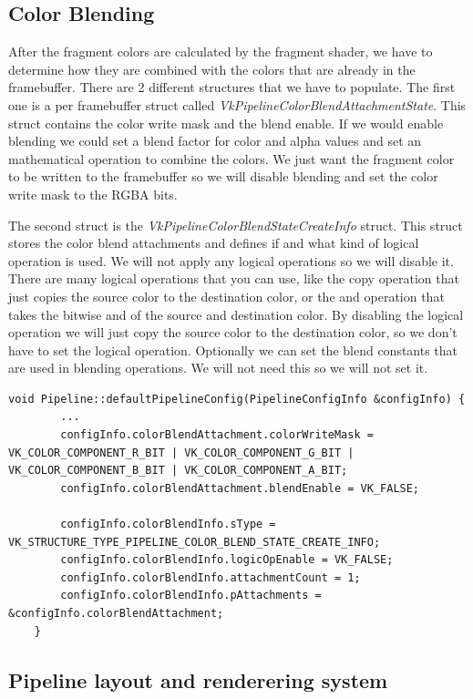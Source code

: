 \documentclass[12pt]{report} \usepackage{preamble}
\begin{document}
\subsection{Color Blending}

After the fragment colors are calculated by the fragment shader, we have to determine how they are combined with the colors
that are already in the framebuffer. There are 2 different structures that we have to populate. The first one is a per
framebuffer struct called \textit{VkPipelineColorBlendAttachmentState}. This struct contains the color write mask and the
blend enable. If we would enable blending we could set a blend factor for color and alpha values and set
an mathematical operation to combine the colors. We just want the fragment color to be written to the framebuffer
so we will disable blending and set the color write mask to the RGBA bits.

The second struct is the \textit{VkPipelineColorBlendStateCreateInfo} struct. This struct stores the color blend attachments
and defines if and what kind of logical operation is used. We will not apply any logical operations so we will disable it.
There are many logical operations that you can use, like the copy operation that just copies the source color to the
destination color, or the and operation that takes the bitwise and of the source and destination color. By disabling the
logical operation we will just copy the source color to the destination color, so we don't have to set the logical operation.
Optionally we can set the blend constants that are used in blending operations. We will not need this so we will not set it.

\begin{lstlisting}[Language=C++]
void Pipeline::defaultPipelineConfig(PipelineConfigInfo &configInfo) {
		...
		configInfo.colorBlendAttachment.colorWriteMask = VK_COLOR_COMPONENT_R_BIT | VK_COLOR_COMPONENT_G_BIT | VK_COLOR_COMPONENT_B_BIT | VK_COLOR_COMPONENT_A_BIT;
		configInfo.colorBlendAttachment.blendEnable = VK_FALSE;

		configInfo.colorBlendInfo.sType = VK_STRUCTURE_TYPE_PIPELINE_COLOR_BLEND_STATE_CREATE_INFO;
		configInfo.colorBlendInfo.logicOpEnable = VK_FALSE;
		configInfo.colorBlendInfo.attachmentCount = 1;
		configInfo.colorBlendInfo.pAttachments = &configInfo.colorBlendAttachment;
	}
\end{lstlisting}

\subsection{Pipeline layout and renderering system}
\end{document}
